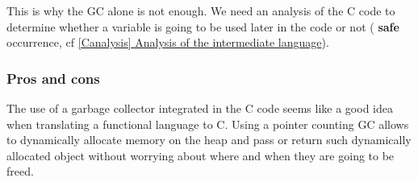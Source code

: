 \documentclass[12pt,a4paper]{article}
\newcommand{\safe}{ \textbf{ safe } }
\begin{document}
This is why the GC alone is not enough. We need an analysis of the C code to determine whether a variable is going to be used later in the code or not (\safe occurrence, cf \hyperref[Canalysis]{\ref*{Canalysis} Analysis of the intermediate language}).


\subsubsection{Pros and cons}

The use of a garbage collector integrated in the C code seems like a good idea when translating a functional language to C. Using a pointer counting GC allows to dynamically allocate memory on the heap and pass or return such dynamically allocated object without worrying about where and when they are going to be freed.\\
\end{document}
